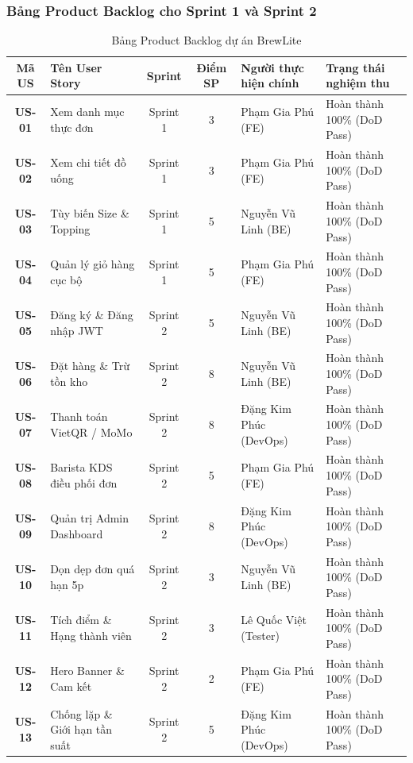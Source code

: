 \documentclass[11pt,a4paper]{article}
\begin{document}
\subsubsection{Bảng Product Backlog cho Sprint 1 và Sprint 2}

\begin{table}[H]
\centering
\small
\renewcommand{\arraystretch}{0.90}
\begin{tabularx}{\linewidth}{|c|p{2.8cm}|c|c|p{3.8cm}|Y|}
\hline
{}
\textbf{Mã US} & \textbf{Tên User Story} & \textbf{Sprint} & \textbf{Điểm SP} & \textbf{Người thực hiện chính} & \textbf{Trạng thái nghiệm thu} \\ \hline
\textbf{US-01} & Xem danh mục thực đơn & Sprint 1 & 3 & Phạm Gia Phú (FE) & Hoàn thành 100\% (DoD Pass) \\ \hline
\textbf{US-02} & Xem chi tiết đồ uống & Sprint 1 & 3 & Phạm Gia Phú (FE) & Hoàn thành 100\% (DoD Pass) \\ \hline
\textbf{US-03} & Tùy biến Size \& Topping & Sprint 1 & 5 & Nguyễn Vũ Linh (BE) & Hoàn thành 100\% (DoD Pass) \\ \hline
\textbf{US-04} & Quản lý giỏ hàng cục bộ & Sprint 1 & 5 & Phạm Gia Phú (FE) & Hoàn thành 100\% (DoD Pass) \\ \hline
\textbf{US-05} & Đăng ký \& Đăng nhập JWT & Sprint 2 & 5 & Nguyễn Vũ Linh (BE) & Hoàn thành 100\% (DoD Pass) \\ \hline
\textbf{US-06} & Đặt hàng \& Trừ tồn kho & Sprint 2 & 8 & Nguyễn Vũ Linh (BE) & Hoàn thành 100\% (DoD Pass) \\ \hline
\textbf{US-07} & Thanh toán VietQR / MoMo & Sprint 2 & 8 & Đặng Kim Phúc (DevOps) & Hoàn thành 100\% (DoD Pass) \\ \hline
\textbf{US-08} & Barista KDS điều phối đơn & Sprint 2 & 5 & Phạm Gia Phú (FE) & Hoàn thành 100\% (DoD Pass) \\ \hline
\textbf{US-09} & Quản trị Admin Dashboard & Sprint 2 & 8 & Đặng Kim Phúc (DevOps) & Hoàn thành 100\% (DoD Pass) \\ \hline
\textbf{US-10} & Dọn dẹp đơn quá hạn 5p & Sprint 2 & 3 & Nguyễn Vũ Linh (BE) & Hoàn thành 100\% (DoD Pass) \\ \hline
\textbf{US-11} & Tích điểm \& Hạng thành viên & Sprint 2 & 3 & Lê Quốc Việt (Tester) & Hoàn thành 100\% (DoD Pass) \\ \hline
\textbf{US-12} & Hero Banner \& Cam kết & Sprint 2 & 2 & Phạm Gia Phú (FE) & Hoàn thành 100\% (DoD Pass) \\ \hline
\textbf{US-13} & Chống lặp \& Giới hạn tần suất & Sprint 2 & 5 & Đặng Kim Phúc (DevOps) & Hoàn thành 100\% (DoD Pass) \\ \hline
\end{tabularx}
\caption{Bảng Product Backlog dự án BrewLite}
\label{tab:backlog}
\end{table}
\clearpage
\end{document}
